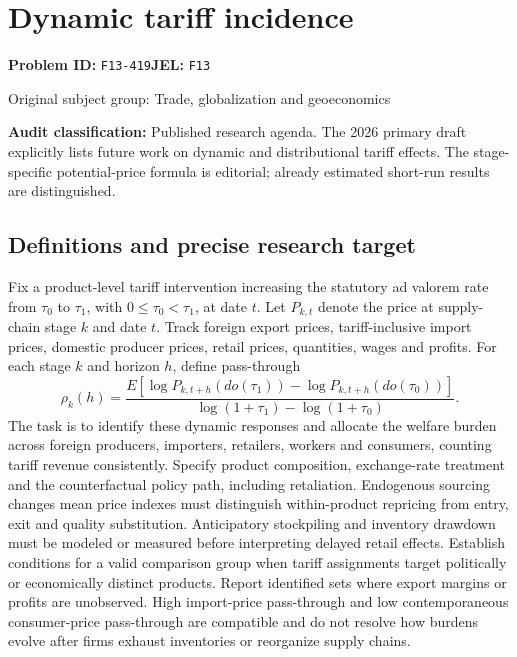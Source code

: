 \documentclass[11pt,a4paper]{article}
\begin{document}
\section*{Dynamic tariff incidence}
\textbf{Problem ID:} \texttt{F13-419}\quad \textbf{JEL:} \texttt{F13}\par
\label{problem:OP-0342}
{\sffamily\small\color{muted}Original subject group: Trade, globalization and geoeconomics\par}
\label{definitions:problem:30007624}
\textbf{Audit classification:} Published research agenda. The 2026 primary draft explicitly lists future work on dynamic and distributional tariff effects. The stage-specific potential-price formula is editorial; already estimated short-run results are distinguished.
\subsection*{Definitions and precise research target}
Fix a product-level tariff intervention increasing the statutory ad valorem rate from \(\tau_0\) to \(\tau_1\), with \(0\leq\tau_0<\tau_1\), at date \(t\). Let \(P_{k,t}\) denote the price at supply-chain stage \(k\) and date \(t\). Track foreign export prices, tariff-inclusive import prices, domestic producer prices, retail prices, quantities, wages and profits. For each stage \(k\) and horizon \(h\), define pass-through
\[\rho_k(h)=\frac{E[\log P_{k,t+h}(do(\tau_1))-\log P_{k,t+h}(do(\tau_0))]}{\log(1+\tau_1)-\log(1+\tau_0)}.\]
The task is to identify these dynamic responses and allocate the welfare burden across foreign producers, importers, retailers, workers and consumers, counting tariff revenue consistently. Specify product composition, exchange-rate treatment and the counterfactual policy path, including retaliation. Endogenous sourcing changes mean price indexes must distinguish within-product repricing from entry, exit and quality substitution. Anticipatory stockpiling and inventory drawdown must be modeled or measured before interpreting delayed retail effects. Establish conditions for a valid comparison group when tariff assignments target politically or economically distinct products. Report identified sets where export margins or profits are unobserved. High import-price pass-through and low contemporaneous consumer-price pass-through are compatible and do not resolve how burdens evolve after firms exhaust inventories or reorganize supply chains.
\end{document}
